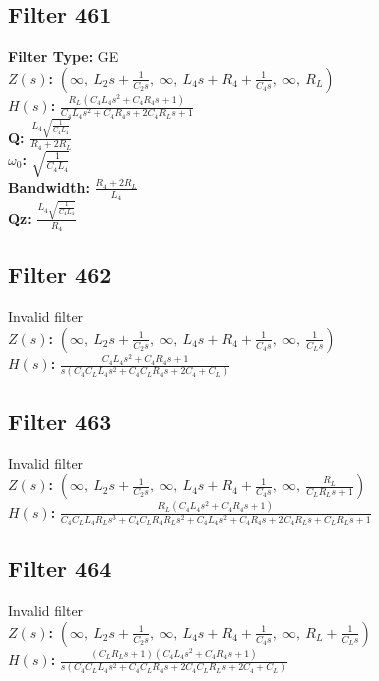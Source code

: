 \documentclass{article}
\begin{document}
\subsection*{Filter 461}
\textbf{Filter Type:} GE \\ 
\textbf{$Z(s)$:} $\left( \infty, \  L_{2} s + \frac{1}{C_{2} s}, \  \infty, \  L_{4} s + R_{4} + \frac{1}{C_{4} s}, \  \infty, \  R_{L}\right)$ \\ 
\textbf{$H(s)$:} $\frac{R_{L} \left(C_{4} L_{4} s^{2} + C_{4} R_{4} s + 1\right)}{C_{4} L_{4} s^{2} + C_{4} R_{4} s + 2 C_{4} R_{L} s + 1}$ \\ 
\textbf{Q:} $\frac{L_{4} \sqrt{\frac{1}{C_{4} L_{4}}}}{R_{4} + 2 R_{L}}$ \\ 
\textbf{$\omega_0$:} $\sqrt{\frac{1}{C_{4} L_{4}}}$ \\ 
\textbf{Bandwidth:} $\frac{R_{4} + 2 R_{L}}{L_{4}}$ \\ 
\textbf{Qz:} $\frac{L_{4} \sqrt{\frac{1}{C_{4} L_{4}}}}{R_{4}}$ \\ 
\subsection*{Filter 462}
Invalid filter \\ 
\textbf{$Z(s)$:} $\left( \infty, \  L_{2} s + \frac{1}{C_{2} s}, \  \infty, \  L_{4} s + R_{4} + \frac{1}{C_{4} s}, \  \infty, \  \frac{1}{C_{L} s}\right)$ \\ 
\textbf{$H(s)$:} $\frac{C_{4} L_{4} s^{2} + C_{4} R_{4} s + 1}{s \left(C_{4} C_{L} L_{4} s^{2} + C_{4} C_{L} R_{4} s + 2 C_{4} + C_{L}\right)}$ \\ 
\subsection*{Filter 463}
Invalid filter \\ 
\textbf{$Z(s)$:} $\left( \infty, \  L_{2} s + \frac{1}{C_{2} s}, \  \infty, \  L_{4} s + R_{4} + \frac{1}{C_{4} s}, \  \infty, \  \frac{R_{L}}{C_{L} R_{L} s + 1}\right)$ \\ 
\textbf{$H(s)$:} $\frac{R_{L} \left(C_{4} L_{4} s^{2} + C_{4} R_{4} s + 1\right)}{C_{4} C_{L} L_{4} R_{L} s^{3} + C_{4} C_{L} R_{4} R_{L} s^{2} + C_{4} L_{4} s^{2} + C_{4} R_{4} s + 2 C_{4} R_{L} s + C_{L} R_{L} s + 1}$ \\ 
\subsection*{Filter 464}
Invalid filter \\ 
\textbf{$Z(s)$:} $\left( \infty, \  L_{2} s + \frac{1}{C_{2} s}, \  \infty, \  L_{4} s + R_{4} + \frac{1}{C_{4} s}, \  \infty, \  R_{L} + \frac{1}{C_{L} s}\right)$ \\ 
\textbf{$H(s)$:} $\frac{\left(C_{L} R_{L} s + 1\right) \left(C_{4} L_{4} s^{2} + C_{4} R_{4} s + 1\right)}{s \left(C_{4} C_{L} L_{4} s^{2} + C_{4} C_{L} R_{4} s + 2 C_{4} C_{L} R_{L} s + 2 C_{4} + C_{L}\right)}$ \\ 
\end{document}
